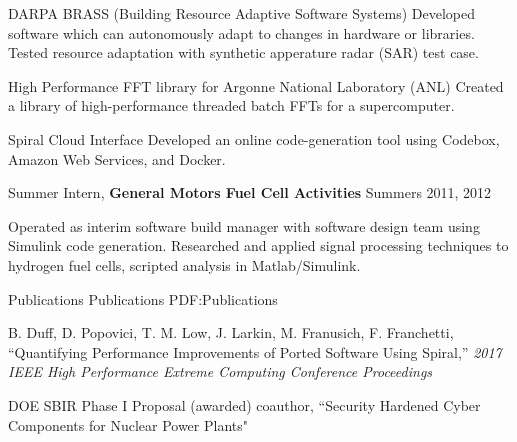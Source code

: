\documentclass[letterpaper,MMMyyyy,nonstopmode]{simpleresumecv}
\begin{document}
\begin{Body}
\BulletItem
DARPA BRASS (Building Resource Adaptive Software Systems)
\SubBulletItem
Developed software which can autonomously adapt to changes in hardware or libraries.
\SubBulletItem
Tested resource adaptation with synthetic apperature radar (SAR) test case.

\BulletItem
High Performance FFT library for Argonne National Laboratory (ANL)
\SubBulletItem
Created a library of high-performance threaded batch FFTs for a supercomputer.

\BulletItem
Spiral Cloud Interface
\SubBulletItem
Developed an online code-generation tool using Codebox, Amazon Web Services, and Docker.


\BigGap
\Entry
Summer Intern,
\textbf{General Motors Fuel Cell Activities}
\hfill
Summers 2011, 2012

\Gap
\BulletItem
Operated as interim software build manager with software design team using Simulink code generation.
\BulletItem
Researched and applied signal processing techniques to hydrogen fuel cells, scripted analysis in Matlab/Simulink.


%
%
%




\Section
{Publications}
{Publications}
{PDF:Publications}

\begingroup

\Gap
B. Duff, D. Popovici, T. M. Low, J. Larkin, M. Franusich, F. Franchetti,
``Quantifying Performance Improvements of Ported Software Using Spiral,''
\textit{2017 IEEE High Performance Extreme Computing Conference Proceedings}

\Gap
DOE SBIR Phase I Proposal (awarded) coauthor, ``Security Hardened Cyber Components for Nuclear Power Plants"



\end{Body}
\end{document}
